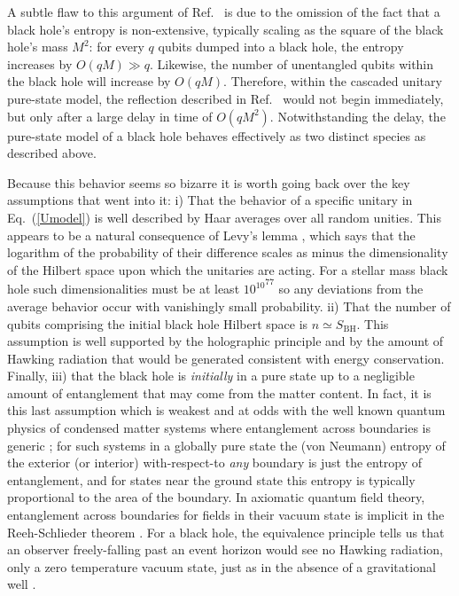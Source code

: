 \documentclass[twocolumn,aps,prl]{revtex4}
\begin{document}
A subtle flaw to this argument of Ref.~ is due
to the omission of the fact that a black hole's entropy is
non-extensive, typically scaling as the square of the black hole's
mass $M^2$: for every $q$ qubits dumped into a black hole, the
entropy increases by $O(qM)\gg q$. Likewise, the number of
unentangled qubits within the black hole will increase by $O(qM)$.
Therefore, within the cascaded unitary pure-state model, the reflection
described in Ref.~ would not begin immediately,
but only after a large delay in time of $O(qM^2)$. Notwithstanding the
delay, the pure-state model of a black hole behaves effectively as
two distinct species as described above.

Because this behavior seems so bizarre it is worth going back over the
key assumptions that went into it: i) That the behavior of a specific
unitary in Eq.~(\ref{Umodel}) is well described by Haar averages over 
all random unities. This appears to be a natural consequence of
Levy's lemma \cite{Levy}, which says that the logarithm of the
probability of their difference scales as minus the dimensionality of
the Hilbert space upon which the unitaries are acting. For a stellar
mass black hole such dimensionalities must be at least ${10^{10}}^{77}$
so any deviations from the average behavior occur with vanishingly
small probability. ii) That the number of qubits comprising the initial
black hole Hilbert space is $n\simeq S_{\text{BH}}$. This assumption
is well supported by the holographic principle \cite{tHooft93} and
by the amount of Hawking radiation that would be generated consistent with
energy conservation. Finally, iii) that the black hole is
{\it initially\/} in a pure state up to a negligible amount of entanglement
that may come from the matter content. In fact, it is this last assumption
which is weakest and at odds with the well known quantum physics
of condensed matter systems where entanglement across boundaries is
generic \cite{Eisert09}; for such systems in a globally pure state
the (von Neumann) entropy of the exterior (or interior)
with-respect-to {\it any\/} boundary is just the entropy of
entanglement, and for states near the ground state this entropy is
typically proportional to the area of the boundary. In axiomatic
quantum field theory, entanglement across boundaries for fields in
their vacuum state is implicit in the Reeh-Schlieder
theorem \cite{Schlieder}. For a black hole, the equivalence principle
tells us that an observer freely-falling past an event horizon
would see no Hawking radiation, only a zero temperature vacuum
state, just as in the absence of a gravitational
well \cite{Susskind93}.
\end{document}
